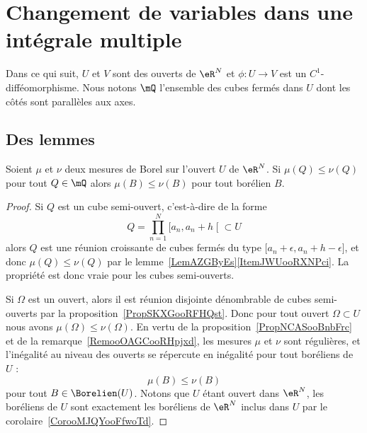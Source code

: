 \section{Changement de variables dans une intégrale multiple}

Dans ce qui suit, \( U\) et \( V\) sont des ouverts de \( \eR^N\) et \( \phi\colon U\to V\) est un \( C^1\)-difféomorphisme. Nous notons \( \mQ\) l'ensemble des cubes fermés dans \( U\) dont les côtés sont parallèles aux axes.

\subsection{Des lemmes}

\begin{lemma}      \label{LemooJYCGooIkkDVn}
	Soient \( \mu\) et \( \nu\) deux mesures de Borel sur l'ouvert \( U\) de \( \eR^N\). Si \( \mu(Q)\leq \nu(Q)\) pour tout \( Q\in \mQ\) alors \( \mu(B)\leq \nu(B)\) pour tout borélien \( B\).
\end{lemma}

\begin{proof}
	Si \( Q\) est un cube semi-ouvert, c'est-à-dire de la forme
	\begin{equation}
		Q=\prod_{n=1}^N\mathopen[ a_n , a_n+h \mathclose[\subset U
	\end{equation}
	alors \( Q\) est une réunion croissante de cubes fermés du type \( \mathopen[ a_n+\epsilon , a_n+h-\epsilon \mathclose]\), et donc \( \mu(Q)\leq \nu(Q)\) par le lemme~\ref{LemAZGByEs}\ref{ItemJWUooRXNPci}. La propriété est donc vraie pour les cubes semi-ouverts.

	Si \( \Omega\) est un ouvert, alors il est réunion disjointe dénombrable de cubes semi-ouverts par la proposition~\ref{PropSKXGooRFHQst}. Donc pour tout ouvert \( \Omega\subset U\) nous avons \( \mu(\Omega)\leq\nu(\Omega)\). En vertu de la proposition~\ref{PropNCASooBnbFrc} et de la remarque~\ref{RemooOAGCooRHpjxd}, les mesures \( \mu\) et \( \nu\) sont régulières, et l'inégalité au niveau des ouverts se répercute en inégalité pour tout boréliens de \( U\) :
	\begin{equation}
		\mu(B)\leq \nu(B)
	\end{equation}
	pour tout \( B\in\Borelien(U)\). Notons que \( U\) étant ouvert dans \( \eR^N\), les boréliens de \( U\) sont exactement les boréliens de \( \eR^N\) inclus dans \( U\) par le corolaire~\ref{CorooMJQYooFfwoTd}.
\end{proof}

